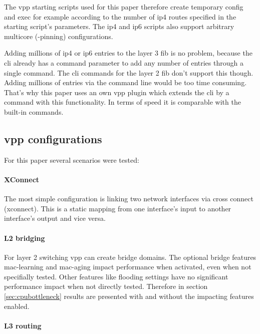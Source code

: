 The \Ac{vpp} starting scripts used for this paper therefore create
temporary \Ac{config} and \Ac{exec} for example according to the
number of \Ac{ip4} routes specified in the starting script's
parameters. The \Ac{ip4} and \Ac{ip6} scripts also support arbitrary
multicore (-pinning) configurations.


Adding millions of \Ac{ip4} or \Ac{ip6} entries to the layer 3
\Ac{fib} is no problem, because the \Ac{cli} already has a command
parameter to add any number of entries through a single command. The
\Ac{cli} commands for the layer 2 \Ac{fib} don't support this though.
Adding millions of entries via the command line would be too time
consuming. That's why this paper uses an own \Ac{vpp} plugin which
extends the \Ac{cli} by a command with this functionality. In terms of
speed it is comparable with the built-in commands.


\subsection{\Ac{vpp} configurations}

For this paper several scenarios were tested: 

\paragraph{XConnect} 

The most simple configuration is linking two network interfaces via
cross connect (xconnect). This is a static mapping from one
interface's input to another interface's output and vice versa.

\paragraph{L2 bridging}

For layer 2 switching \Ac{vpp} can create bridge domains. The optional
bridge features mac-learning and mac-aging impact performance when
activated, even when not specifially tested. Other features like
flooding settings have no significant performance impact when not
directly tested. Therefore in section \ref{sec:cpubottleneck} results
are presented with and without the impacting features enabled.

\paragraph{L3 routing}

